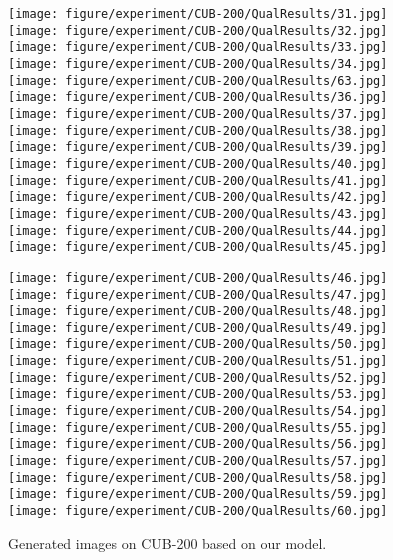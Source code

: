 \documentclass{article} \usepackage{iclr2017_conference,times}
\begin{document}
\begin{figure}[t]
  \begin{minipage}{1.0\textwidth}
  \texttt{[image: figure/experiment/CUB-200/QualResults/31.jpg]}
  \texttt{[image: figure/experiment/CUB-200/QualResults/32.jpg]}
  \texttt{[image: figure/experiment/CUB-200/QualResults/33.jpg]}
  \texttt{[image: figure/experiment/CUB-200/QualResults/34.jpg]}
  \texttt{[image: figure/experiment/CUB-200/QualResults/63.jpg]}
  \texttt{[image: figure/experiment/CUB-200/QualResults/36.jpg]}
  \texttt{[image: figure/experiment/CUB-200/QualResults/37.jpg]}
  \texttt{[image: figure/experiment/CUB-200/QualResults/38.jpg]}
  \texttt{[image: figure/experiment/CUB-200/QualResults/39.jpg]}
  \texttt{[image: figure/experiment/CUB-200/QualResults/40.jpg]}
  \texttt{[image: figure/experiment/CUB-200/QualResults/41.jpg]}
  \texttt{[image: figure/experiment/CUB-200/QualResults/42.jpg]}
  \texttt{[image: figure/experiment/CUB-200/QualResults/43.jpg]}
  \texttt{[image: figure/experiment/CUB-200/QualResults/44.jpg]}
  \texttt{[image: figure/experiment/CUB-200/QualResults/45.jpg]}
\vspace{-0.35cm}  
  \end{minipage}  
  
  \begin{minipage}{1.0\textwidth}
  \texttt{[image: figure/experiment/CUB-200/QualResults/46.jpg]}
  \texttt{[image: figure/experiment/CUB-200/QualResults/47.jpg]}
  \texttt{[image: figure/experiment/CUB-200/QualResults/48.jpg]}
  \texttt{[image: figure/experiment/CUB-200/QualResults/49.jpg]}
  \texttt{[image: figure/experiment/CUB-200/QualResults/50.jpg]}
  \texttt{[image: figure/experiment/CUB-200/QualResults/51.jpg]}
  \texttt{[image: figure/experiment/CUB-200/QualResults/52.jpg]}
  \texttt{[image: figure/experiment/CUB-200/QualResults/53.jpg]}
  \texttt{[image: figure/experiment/CUB-200/QualResults/54.jpg]}
  \texttt{[image: figure/experiment/CUB-200/QualResults/55.jpg]}
  \texttt{[image: figure/experiment/CUB-200/QualResults/56.jpg]}
  \texttt{[image: figure/experiment/CUB-200/QualResults/57.jpg]}
  \texttt{[image: figure/experiment/CUB-200/QualResults/58.jpg]}
  \texttt{[image: figure/experiment/CUB-200/QualResults/59.jpg]}
  \texttt{[image: figure/experiment/CUB-200/QualResults/60.jpg]}
\vspace{-0.35cm}  
  \end{minipage}          
\caption{Generated images on CUB-200 based on our model.}
\label{Fig_CUB_QualitativeResults}
\end{figure}
\end{document}
